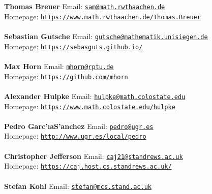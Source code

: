 \documentclass[a4paper,11pt]{report}
\begin{document}
\begin{titlepage}
\mbox{}\\
{\mbox{}\\
\small \noindent \textbf{ Thomas Breuer   }  Email: \href{mailto://sam@math.rwth-aachen.de} {\texttt{sam@math.rwth\texttt{}aachen.de}}\\
  Homepage: \href{https://www.math.rwth-aachen.de/~Thomas.Breuer} {\texttt{https://www.math.rwth\texttt{}aachen.de/\texttt{}Thomas.Breuer}}}\\
{\mbox{}\\
\small \noindent \textbf{ Sebastian Gutsche   }  Email: \href{mailto://gutsche@mathematik.uni-siegen.de} {\texttt{gutsche@mathematik.uni\texttt{}siegen.de}}\\
  Homepage: \href{https://sebasguts.github.io/} {\texttt{https://sebasguts.github.io/}}}\\
{\mbox{}\\
\small \noindent \textbf{ Max Horn   }  Email: \href{mailto://mhorn@rptu.de} {\texttt{mhorn@rptu.de}}\\
  Homepage: \href{https://github.com/mhorn} {\texttt{https://github.com/mhorn}}}\\
{\mbox{}\\
\small \noindent \textbf{ Alexander Hulpke   }  Email: \href{mailto://hulpke@math.colostate.edu} {\texttt{hulpke@math.colostate.edu}}\\
  Homepage: \href{https://www.math.colostate.edu/~hulpke} {\texttt{https://www.math.colostate.edu/\texttt{}hulpke}}}\\
{\mbox{}\\
\small \noindent \textbf{ Pedro Garc{\a'\i}a\texttt{}S{\a'a}nchez   }  Email: \href{mailto://pedro@ugr.es} {\texttt{pedro@ugr.es}}\\
  Homepage: \href{http://www.ugr.es/local/pedro} {\texttt{http://www.ugr.es/local/pedro}}}\\
{\mbox{}\\
\small \noindent \textbf{ Christopher Jefferson   }  Email: \href{mailto://caj21@st-andrews.ac.uk} {\texttt{caj21@st\texttt{}andrews.ac.uk}}\\
  Homepage: \href{https://caj.host.cs.st-andrews.ac.uk/} {\texttt{https://caj.host.cs.st\texttt{}andrews.ac.uk/}}}\\
{\mbox{}\\
\small \noindent \textbf{ Stefan Kohl   }  Email: \href{mailto://stefan@mcs.st-and.ac.uk} {\texttt{stefan@mcs.st\texttt{}and.ac.uk}}\\
}
\end{titlepage}
\end{document}
